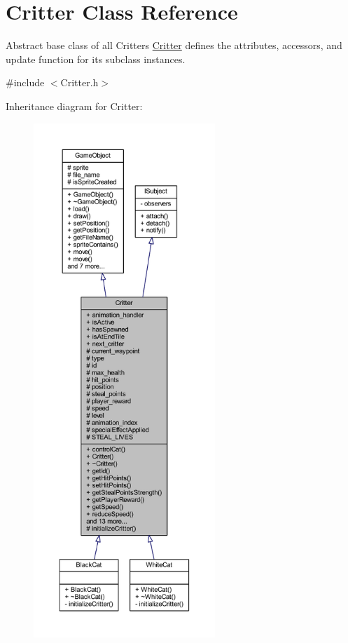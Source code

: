 \hypertarget{class_critter}{\section{Critter Class Reference}
\label{class_critter}
}


Abstract base class of all Critters \hyperlink{class_critter}{Critter} defines the attributes, accessors, and update function for its subclass instances.  




{\ttfamily \#include $<$Critter.\+h$>$}



Inheritance diagram for Critter\+:
\nopagebreak
\begin{figure}[H]
\begin{center}
\leavevmode
\includegraphics[height=550pt]{class_critter__inherit__graph}
\end{center}
\end{figure}


